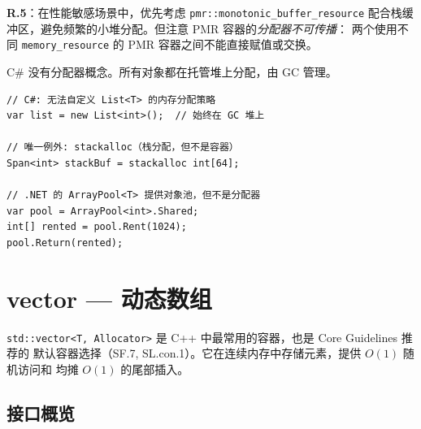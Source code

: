 \documentclass[12pt,a4paper,fontset=fandol]{ctexbook}
\newcommand{\Tp}[1]{\texttt{#1}}
\begin{document}
\begin{guideline}
\textbf{R.5}：在性能敏感场景中，优先考虑 \texttt{pmr::monotonic\_buffer\_resource}
配合栈缓冲区，避免频繁的小堆分配。但注意 PMR 容器的\emph{分配器不可传播}：
两个使用不同 \texttt{memory\_resource} 的 PMR 容器之间不能直接赋值或交换。
\end{guideline}

\begin{compare}
C\# 没有分配器概念。所有对象都在托管堆上分配，由 GC 管理。
\begin{lstlisting}[style=csharpstyle]
// C#: 无法自定义 List<T> 的内存分配策略
var list = new List<int>();  // 始终在 GC 堆上

// 唯一例外: stackalloc（栈分配，但不是容器）
Span<int> stackBuf = stackalloc int[64];

// .NET 的 ArrayPool<T> 提供对象池，但不是分配器
var pool = ArrayPool<int>.Shared;
int[] rented = pool.Rent(1024);
pool.Return(rented);
\end{lstlisting}
\end{compare}

\chapter{vector --- 动态数组}

\Tp{std::vector<T, Allocator>} 是 C++ 中最常用的容器，也是 Core Guidelines 推荐的
默认容器选择（SF.7, SL.con.1）。它在连续内存中存储元素，提供 $O(1)$ 随机访问和
均摊 $O(1)$ 的尾部插入。

\section{接口概览}
\end{document}
